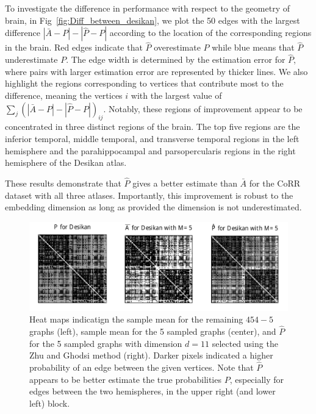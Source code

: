 \documentclass[10pt,letterpaper]{article}
\begin{document}
To investigate the difference in performance with respect to the geometry of brain, 
in Fig~\ref{fig:Diff_between_desikan}, we plot the 50 edges with the largest difference $|\bar{A} - P| - |\hat{P} - P|$ according to the location of the corresponding regions in the brain. Red edges indicate that $\hat{P}$ overestimate $P$ while blue means that $\hat{P}$ underestimate $P$. The edge width is determined by the estimation error for $\hat{P}$, where pairs with larger estimation error are represented by thicker lines.
We also highlight the regions corresponding to vertices that contribute most to the difference, meaning the vertices $i$ with the largest value of $\sum_j (|\bar{A} - P| - |\hat{P} - P|)_{ij}$.
Notably, these regions of improvement appear to be concentrated in three distinct regions of the brain. 
The top five regions are the inferior temporal, middle temporal, and transverse temporal regions in the left hemisphere and the parahippocampal and parsopercularis regions in the right hemisphere of the Desikan atlas.

These results demonstrate that $\hat{P}$ gives a better estimate than $\bar{A}$ for the CoRR dataset with all three atlases. 
Importantly, this improvement is robust to the embedding dimension as long as provided the dimension is not underestimated.

\begin{figure}[!htb]
\centering
\includegraphics[width=1\textwidth]{Matrix_desikan_m5.pdf}
\caption{Heat maps indicatign the sample mean for the remaining $454-5$ graphs (left), sample mean for the 5 sampled graphs (center), and $\hat{P}$ for the 5 sampled graphs with dimension $d=11$ selected using the Zhu and Ghodsi method (right).
Darker pixels indicated a higher probability of an edge between the given vertices.
Note that $\hat{P}$ appears to be better estimate the true probabilities $P$, especially for edges between the two hemispheres, in the upper right (and lower left) block.
}
\label{fig:Matrix_desikan_m5}
\end{figure}
\end{document}

